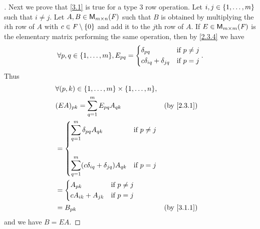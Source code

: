 \begin{proof}[]
  Next we prove that \cref{3.1} is true for a type 3 row operation.
  Let \(i, j \in \left\lbrace1, \dots, m\right\rbrace\) such that \(i \neq j\).
  Let \(A, B \in \ms\) such that \(B\) is obtained by multiplying the \(i\)th row of \(A\) with \(c \in \mathit{F} \setminus \left\lbrace0\right\rbrace\) and add it to the \(j\)th row of \(A\).
  If \(E \in \ms[m][m][\F]\) is the elementary matrix performing the same operation, then by \cref{2.3.4} we have
  \[
    \forall p, q \in \set{1, \dots, m}, E_{p q} = \begin{dcases}
      \delta_{p q}                  & \text{if } p \neq j \\
      c \delta_{i q} + \delta_{j q} & \text{if } p = j
    \end{dcases}.
  \]
  Thus
  \begin{align*}
     & \forall (p, k) \in \set{1, \dots, m} \times \set{1, \dots, n},                                                        \\
     & (EA)_{p k} = \sum_{q = 1}^m E_{p q} A_{q k}                                                           &  & \by{2.3.1} \\
     & = \begin{dcases}
           \sum_{q = 1}^m \delta_{p q} A_{q k}                    & \text{if } p \neq j \\                    \\
           \sum_{q = 1}^m (c \delta_{i q} + \delta_{j q}) A_{q k} & \text{if } p = j
         \end{dcases}                  \\
     & = \begin{dcases}
           A_{p k}             & \text{if } p \neq j \\
           c A_{i k} + A_{j k} & \text{if } p = j
         \end{dcases}                                                                           \\
     & = B_{p k}                                                                                             &  & \by{3.1.1}
  \end{align*}
  and we have \(B = EA\).


\end{proof}

